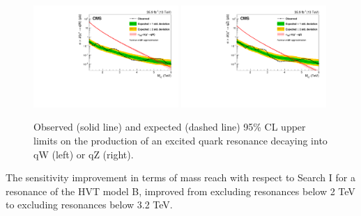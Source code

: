 \begin{figure}[ht!]
\centering
    \includegraphics[width=0.49\textwidth]{figures/analysis/search2/B2G-17-001/figures/brazilianFlag_qW_qVnew_new_combined_13TeV.pdf}
    \includegraphics[width=0.49\textwidth]{figures/analysis/search2/B2G-17-001/figures/brazilianFlag_qZ_qVnew_new_combined_13TeV.pdf}\\
\caption{Observed (solid line) and expected (dashed line) 95\% CL upper limits on the production of an excited quark resonance
decaying into qW (left) or qZ (right).}
\label{fig:searchII:limitCombined_qV}
\end{figure}
\par The sensitivity improvement in terms of mass reach with respect to Search I for a \PWpr resonance of the HVT model B,  improved from excluding resonances below 2 TeV to excluding resonances below 3.2 TeV.


